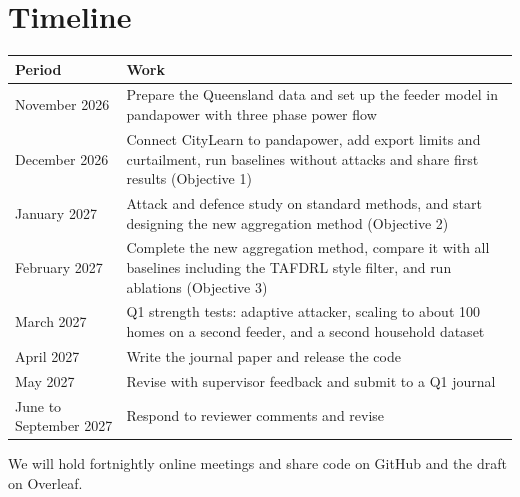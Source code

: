 \documentclass[11pt,a4paper]{article}
\begin{document}
\section{Timeline}
\begin{center}
\small
\begin{tabularx}{\linewidth}{@{}lX@{}}
\toprule
\textbf{Period} & \textbf{Work} \\
\midrule
November 2026 & Prepare the Queensland data and set up the feeder model in pandapower with three phase power flow \\
December 2026 & Connect CityLearn to pandapower, add export limits and curtailment, run baselines without attacks and share first results (Objective 1) \\
January 2027 & Attack and defence study on standard methods, and start designing the new aggregation method (Objective 2) \\
February 2027 & Complete the new aggregation method, compare it with all baselines including the TAFDRL style filter, and run ablations (Objective 3) \\
March 2027 & Q1 strength tests: adaptive attacker, scaling to about 100 homes on a second feeder, and a second household dataset \\
April 2027 & Write the journal paper and release the code \\
May 2027 & Revise with supervisor feedback and submit to a Q1 journal \\
June to September 2027 & Respond to reviewer comments and revise \\
\bottomrule
\end{tabularx}
\end{center}

We will hold fortnightly online meetings and share code on GitHub and the draft on Overleaf.
\end{document}
